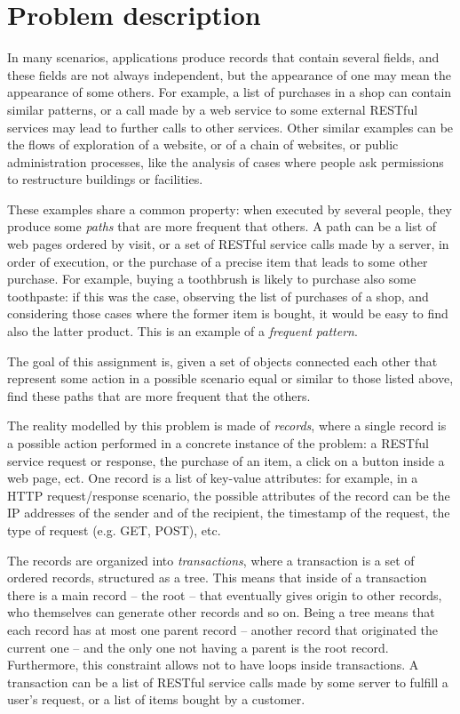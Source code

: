 \documentclass{acm_proc_article-sp-sigmod09}
\begin{document}
\section{Problem description}
In many scenarios, applications produce records that contain several fields, and these fields are not always independent, but the appearance of one may mean the appearance of some others. For example, a list of purchases in a shop can contain similar patterns, or a call made by a web service to some external RESTful services may lead to further calls to other services. Other similar examples can be the flows of exploration of a website, or of a chain of websites, or public administration processes, like the analysis of cases where people ask permissions to restructure buildings or facilities. 

These examples share a common property: when executed by several people, they produce some \emph{paths} that are more frequent that others. A path can be a list of web pages ordered by visit, or a set of RESTful service calls made by a server, in order of execution, or the purchase of a precise item that leads to some other purchase. For example, buying a toothbrush is likely to purchase also some toothpaste: if this was the case, observing the list of purchases of a shop, and considering those cases where the former item is bought, it would be easy to find also the latter product. This is an example of a \emph{frequent pattern}.

The goal of this assignment is, given a set of objects connected each other that represent some action in a possible scenario equal or similar to those listed above, find these paths that are more frequent that the others. 

The reality modelled by this problem is made of \emph{records}, where a single record is a possible action performed in a concrete instance of the problem: a RESTful service request or response, the purchase of an item, a click on a button inside a web page, ect. One record is a list of key-value attributes: for example, in a HTTP request/response scenario, the possible attributes of the record can be the IP addresses of the sender and of the recipient, the timestamp of the request, the type of request (e.g. GET, POST), etc. 

The records are organized into \emph{transactions}, where a transaction is a set of ordered records, structured as a tree. This means that inside of a transaction there is a main record -- the root -- that eventually gives origin to other records, who themselves can generate other records and so on. Being a tree means that each record has at most one parent record -- another record that originated the current one -- and the only one not having a parent is the root record. Furthermore, this constraint allows not to have loops inside transactions. A transaction can be a list of RESTful service calls made by some server to fulfill a user's request, or a list of items bought by a customer.
\end{document}
